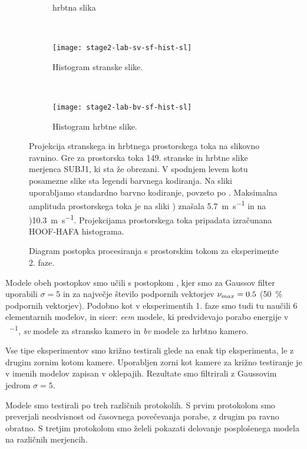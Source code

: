 \begin{figure}[!htb]
\begin{subfigure}[t]{0.45\columnwidth}
		\caption{hrbtna slika}
		\label{fig:stage2-lab-sf-bv-flo}
	\end{subfigure}
	~
	\begin{subfigure}[t]{0.45\columnwidth}
		\texttt{[image: stage2-lab-sv-sf-hist-sl]}
		\caption{Histogram stranske slike.}
	\end{subfigure}
	~
	\begin{subfigure}[t]{0.45\columnwidth}
		\texttt{[image: stage2-lab-bv-sf-hist-sl]}
		\caption{Histogram hrbtne slike.}
	\end{subfigure}
	\caption[Projekcija stranskega in hrbtnega prostorskega toka na slikovno ravnino]{Projekcija stranskega in hrbtnega prostorskega toka na slikovno ravnino. Gre za prostorska toka 149. stranske in hrbtne slike merjenca SUBJ1, ki sta že obrezani. V spodnjem levem kotu posamezne slike sta legendi barvnega kodiranja. Na sliki uporabljamo standardno barvno kodiranje, povzeto po \cite{baker2011database}. Maksimalna amplituda prostorskega toka je na sliki  ) znašala \SI{5.7}{\m\per\s} in na )\SI{10,3}{\m\per\s}. Projekcijama prostorskega toka pripadata izračunana HOOF-HAFA histograma.}
	\label{fig:prostorski-tok-stage2}
\end{figure}

\begin{figure}[!htb]
	\centering
	
	\caption{Diagram postopka procesiranja s prostorskim tokom za eksperimente 2. faze.}
	\label{fig:diagram-procesiranja-sf-stage2}
\end{figure}
 
Modele obeh postopkov smo učili s postopkom \nurbf, kjer smo za Gaussov filter uporabili $\sigma=5$ in za največje število podpornih vektorjev $\nu_{max} =0.5$ (\SI{50}{\%} podpornih vektorjev). Podobno kot v eksperimentih 1. faze smo tudi tu naučili \num{6} elementarnih modelov, in sicer: \textit{eem} modele, ki predvidevajo porabo energije v \si{\kcal\per\min}, \textit{sv} modele za stransko kamero in \textit{bv} modele za hrbtno kamero. %

Vse tipe eksperimentov smo križno testirali glede na enak tip eksperimenta, le z drugim zornim kotom kamere. Uporabljen zorni kot kamere za križno testiranje je v imenih modelov zapisan v oklepajih.  Rezultate smo filtrirali z Gaussovim jedrom $\sigma=5$. 

Modele smo testirali po treh različnih protokolih. S prvim protokolom smo preverjali neodvisnost od časovnega povečevanja porabe, z drugim pa ravno obratno. S tretjim protokolom smo želeli pokazati delovanje posplošenega modela na različnih merjencih.


